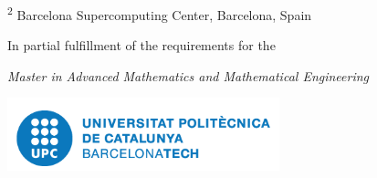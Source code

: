\begin{center}
    \textsuperscript{2} Barcelona Supercomputing Center, Barcelona, Spain

    \vspace{1.5cm}
    \normalsize
    In partial fulfillment of the requirements for the

    \textit{Master in Advanced Mathematics and Mathematical Engineering}

    \vfill
    \includegraphics[height=2.1cm]{img/logo_upc.png}

\end{center}
